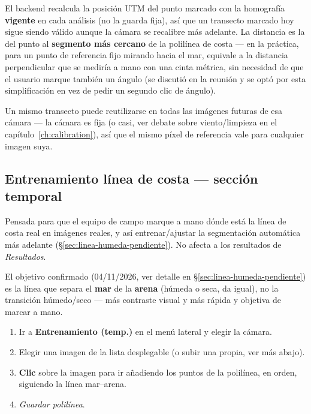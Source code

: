 \begin{warnbox}
El backend recalcula la posición UTM del punto marcado con la homografía \textbf{vigente} en
cada análisis (no la guarda fija), así que un transecto marcado hoy sigue siendo válido aunque la
cámara se recalibre más adelante. La distancia es la del punto al \textbf{segmento más cercano}
de la polilínea de costa — en la práctica, para un punto de referencia fijo mirando hacia el mar,
equivale a la distancia perpendicular que se mediría a mano con una cinta métrica, sin necesidad
de que el usuario marque también un ángulo (se discutió en la reunión y se optó por esta
simplificación en vez de pedir un segundo clic de ángulo).
\end{warnbox}

Un mismo transecto puede reutilizarse en todas las imágenes futuras de esa cámara — la cámara es
fija (o casi, ver debate sobre viento/limpieza en el capítulo~\ref{ch:calibration}), así que el
mismo píxel de referencia vale para cualquier imagen suya.

\subsection{Entrenamiento línea de costa --- sección temporal}
\label{sec:entrenamiento}

\begin{warnbox}
Pensada para que el equipo de campo marque a mano dónde está la línea de costa real en imágenes
reales, y así entrenar/ajustar la segmentación automática más adelante
(\S\ref{sec:linea-humeda-pendiente}). No afecta a los resultados de \textit{Resultados}.
\end{warnbox}

\begin{infobox}
El objetivo confirmado (04/11/2026, ver detalle en \S\ref{sec:linea-humeda-pendiente}) es la
línea que separa el \textbf{mar} de la \textbf{arena} (húmeda o seca, da igual), no la transición
húmedo/seco — más contraste visual y más rápida y objetiva de marcar a mano.
\end{infobox}

\begin{enumerate}[leftmargin=1.5em]
  \item Ir a \textbf{Entrenamiento (temp.)} en el menú lateral y elegir la cámara.
  \item Elegir una imagen de la lista desplegable (o subir una propia, ver más abajo).
  \item \textbf{Clic} sobre la imagen para ir añadiendo los puntos de la polilínea, en orden,
        siguiendo la línea mar--arena.
  \item \textit{Guardar polilínea}.
\end{enumerate}


